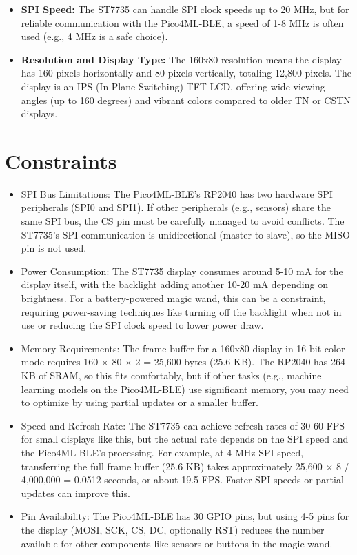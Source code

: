 \begin{itemize}
	\item \textbf{SPI Speed:} The ST7735 can handle SPI clock speeds up to 20 MHz, but for reliable communication with the Pico4ML-BLE, a speed of 1-8 MHz is often used (e.g., 4 MHz is a safe choice).

	\item \textbf{Resolution and Display Type:} The 160x80 resolution means the display has 160 pixels horizontally and 80 pixels vertically, totaling 12,800 pixels. The display is an IPS (In-Plane Switching) TFT LCD, offering wide viewing angles (up to 160 degrees) and vibrant colors compared to older TN or CSTN displays.\cite{Sitronix:2010}

\end{itemize}



\section{Constraints}

\begin{itemize}

	\item SPI Bus Limitations: The Pico4ML-BLE’s RP2040 has two hardware SPI peripherals (SPI0 and SPI1). If other peripherals (e.g., sensors) share the same SPI bus, the CS pin must be carefully managed to avoid conflicts. The ST7735’s SPI communication is unidirectional (master-to-slave), so the MISO pin is not used.

	\item Power Consumption: The ST7735 display consumes around 5-10 mA for the display itself, with the backlight adding another 10-20 mA depending on brightness. For a battery-powered magic wand, this can be a constraint, requiring power-saving techniques like turning off the backlight when not in use or reducing the SPI clock speed to lower power draw.

	\item Memory Requirements: The frame buffer for a 160x80 display in 16-bit color mode requires 160 × 80 × 2 = 25,600 bytes (25.6 KB). The RP2040 has 264 KB of SRAM, so this fits comfortably, but if other tasks (e.g., machine learning models on the Pico4ML-BLE) use significant memory, you may need to optimize by using partial updates or a smaller buffer.

	\item Speed and Refresh Rate: The ST7735 can achieve refresh rates of 30-60 FPS for small displays like this, but the actual rate depends on the SPI speed and the Pico4ML-BLE’s processing. For example, at 4 MHz SPI speed, transferring the full frame buffer (25.6 KB) takes approximately 25,600 × 8 / 4,000,000 = 0.0512 seconds, or about 19.5 FPS. Faster SPI speeds or partial updates can improve this.

	\item Pin Availability: The Pico4ML-BLE has 30 GPIO pins, but using 4-5 pins for the display (MOSI, SCK, CS, DC, optionally RST) reduces the number available for other components like sensors or buttons in the magic wand.\cite{Sitronix:2010}

\end{itemize}



